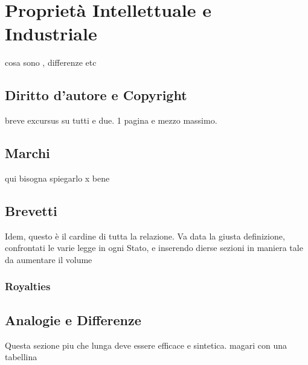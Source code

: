 \chapter{Proprietà Intellettuale e Industriale}
cosa sono , differenze etc
\section{Diritto d'autore e Copyright}
breve excursus su tutti e due. 1 pagina e mezzo massimo.
\section{Marchi}
qui bisogna spiegarlo x bene
\section{Brevetti}
Idem, questo è il cardine di tutta la relazione. Va data la giusta definizione, confrontati le varie legge in ogni Stato, e inserendo dierse sezioni in maniera tale da aumentare il volume
	\subsection{Royalties}

\section{Analogie e Differenze}
Questa sezione piu che lunga deve essere efficace e sintetica. magari con una tabellina

